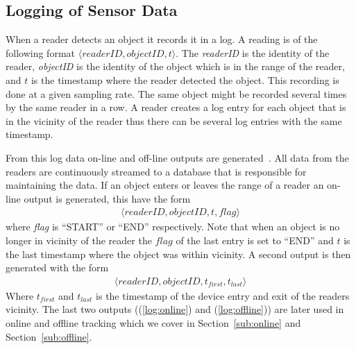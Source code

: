 \subsection{Logging of Sensor Data}
When a reader detects an object it records it in a log. 
A reading is of the following format $\langle readerID,objectID,t\rangle$.
The \textit{readerID} is the identity of the reader, \textit{objectID} is the identity of the object which is in the range of the reader, and $t$ is the timestamp where the reader detected the object.
This recording is done at a given sampling rate. 
The same object might be recorded several times by the same reader in a row. 
A reader creates a log entry for each object that is in the vicinity of the reader thus there can be several log entries with the same timestamp.

From this log data on-line and off-line outputs are generated~\cite{Jensen:2009:GMB:1590953.1591000}.
All data from the readers are continuously streamed to a database that is responsible for maintaining the data.
If an object enters or leaves the range of a reader an on-line output is generated, this have the form
\begin{align}
\label{log:online}
\langle readerID,objectID,t,flag \rangle
\end{align}
where \textit{flag} is ``START'' or ``END'' respectively. 
Note that when an object is no longer in vicinity of the reader the $flag$ of the last entry is set to ``END'' and $t$ is the last timestamp where the object was within vicinity.
A second output is then generated with the form 
\begin{align}
\label{log:offline}
\langle readerID,objectID,t_{first},t_{last} \rangle
\end{align}
Where $t_{first}$ and $t_{last}$ is the timestamp of the device entry and exit of the readers vicinity.
The last two outputs ((\ref{log:online}) and (\ref{log:offline})) are later used in online and offline tracking which we cover in Section~\ref{sub:online} and Section~\ref{sub:offline}.

 
